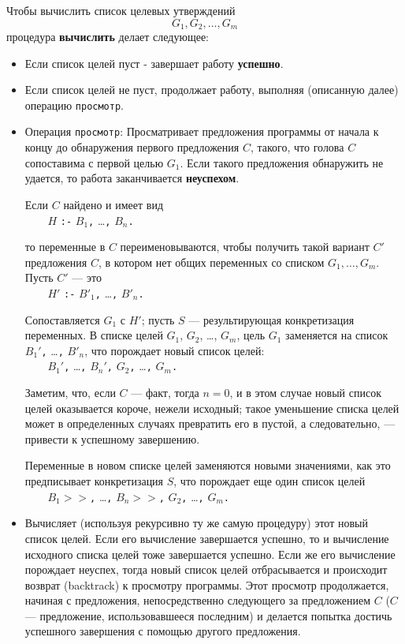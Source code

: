\documentclass[12pt, openany, twoside]{book} %
\begin{document}
Чтобы вычислить список целевых утверждений
$$
    G_1, G_2, \ldots, G_m
$$
процедура \textbf{вычислить} делает следующее:
\begin{itemize}
  \item Если список целей пуст - завершает работу \textbf{успешно}.
  \item Если список целей не пуст, продолжает работу, выполняя (описанную далее) операцию {\tt просмотр}.
  \item Операция \texttt{просмотр}: Просматривает предложения программы от начала к концу до обнаружения первого предложения $C$, такого, что голова $C$ сопоставима с первой целью $G_1$. Если такого предложения обнаружить не удается, то работа заканчивается \textbf{неуспехом}.

\noindent Если $C$ найдено и имеет вид\\[1ex]
\verb|    |$H$ {\tt :-} $B_1${\tt,} \ldots{\tt,} $B_n${\tt.}

\noindent то переменные в $C$ переименовываются, чтобы получить такой вариант $C'$ предложения $C$, в котором нет общих переменных со списком $G_1, \ldots, G_m$. Пусть $C'$ --- это\\[1ex]
\verb|    |$H'$ {\tt :-} $B'_1${\tt,} \ldots{\tt,} $B'_n${\tt.}

\noindent Сопоставляется $G_1$ с $H'$; пусть $S$ --- результирующая конкретизация переменных. В списке целей $G_1$, $G_2$, \ldots, $G_m$, цель $G_1$ заменяется на список $B_1'${\tt,} \ldots{\tt,} $B'_n$, что порождает новый список
целей:\\[1ex]
\verb|    |$B_1'${\tt ,} \ldots{\tt,} $B_n'${\tt,} $G_2${\tt,}
    \ldots{\tt,} $G_m${\tt.}

\noindent Заметим, что, если $C$ --- факт, тогда $n = 0$, и в этом случае
новый список целей оказывается короче, нежели исходный; такое уменьшение списка целей может в определенных случаях превратить его в пустой, а следовательно, --- привести к успешному завершению.

\noindent Переменные в новом списке целей заменяются новыми значениями, как
это предписывает конкретизация $S$, что порождает еще один список целей\\[1ex]
\verb|    |$B_1>>${\tt ,} \ldots{\tt,} $B_n>>${\tt,} $G_2${\tt,}
    \ldots{\tt,} $G_m${\tt.}

  \item Вычисляет (используя рекурсивно ту же самую процедуру) этот новый список целей. Если его вычисление завершается успешно, то и вычисление исходного списка целей тоже завершается успешно. Если же его вычисление порождает неуспех, тогда новый список целей отбрасывается и происходит возврат (backtrack) к просмотру программы. Этот просмотр продолжается, начиная с предложения, непосредственно следующего за предложением $C$ ($C$ --- предложение, использовавшееся последним) и делается попытка достичь успешного завершения с помощью другого предложения.
\end{itemize}
\end{document}
